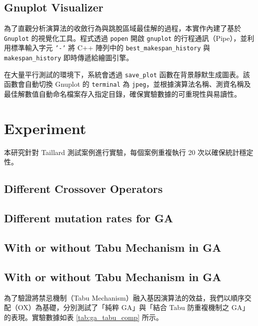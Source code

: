 \documentclass[conference]{IEEEtran}
\begin{document}
\subsection{Gnuplot Visualizer}
為了直觀分析演算法的收斂行為與跳脫區域最佳解的過程，本實作內建了基於 \texttt{Gnuplot} 的視覺化工具。程式透過 \texttt{popen} 開啟 \texttt{gnuplot} 的行程通訊（Pipe），並利用標準輸入字元 \texttt{'-'} 將 C++ 陣列中的 \texttt{best\_makespan\_history} 與 \texttt{makespan\_history} 即時傳遞給繪圖引擎。

在大量平行測試的環境下，系統會透過 \texttt{save\_plot} 函數在背景靜默生成圖表。該函數會自動切換 Gnuplot 的 \texttt{terminal} 為 \texttt{jpeg}，並根據演算法名稱、測資名稱及最佳解數值自動命名檔案存入指定目錄，確保實驗數據的可重現性與易讀性。


\section{Experiment}
\fontsize{10pt}{12pt}\selectfont

本研究針對 Taillard 測試案例進行實驗，每個案例重複執行 20 次以確保統計穩定性。
\subsection{Different Crossover Operators}

\clearpage
\subsection{Different mutation rates for GA}


\subsection{With or without Tabu Mechanism in GA}
\subsection{With or without Tabu Mechanism in GA}

為了驗證將禁忌機制（Tabu Mechanism）融入基因演算法的效益，我們以順序交配（OX）為基礎，分別測試了「純粹 GA」與「結合 Tabu 防重複機制之 GA」的表現。實驗數據如表 \ref{tab:ga_tabu_comp} 所示。
\end{document}
